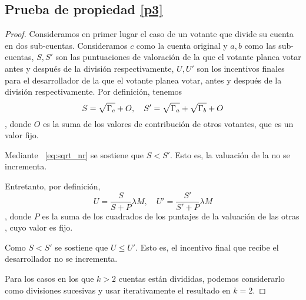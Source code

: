 \subsection{Prueba de propiedad \ref{p3}}
\begin{proof}
	Consideramos en primer lugar el caso de un votante que divide su cuenta en dos sub-cuentas. Consideramos $c$ como la cuenta original y $a,b$ como las sub-cuentas, $S,S'$ son las puntuaciones de valoración de la \dapp que el votante planea votar antes y después de la división respectivamente, $U,U'$ son los incentivos finales para el desarrollador de la \dapp que el votante planea votar, antes y después de la división respectivamente. Por definición, tenemos
	$$S= \sqrt{\Gamma_c}+O,\quad S'=\sqrt{\Gamma_a}+\sqrt{\Gamma_b}+O$$,
	donde $O$ es la suma de los valores de contribución de otros votantes, que es un valor fijo.

	Mediante ~\ref{eq:sqrt_nr} se sostiene que $S < S'$. Esto es, la valuación de la \dapp no se incrementa.

	Entretanto, por definición,
	$$U = \frac{S}{S+P}\lambda M,\quad U' = \frac{S'}{S'+P} \lambda M$$,
	donde $P$ es la suma de los cuadrados de los puntajes de la valuación de las otras \dapp, cuyo valor es fijo.

	Como $S < S'$ se sostiene que $U \leq U'$. Esto es, el incentivo final que recibe el desarrollador no se incrementa.

	Para los casos en los que $k>2$ cuentas están divididas, podemos considerarlo como divisiones sucesivas y usar iterativamente el resultado en $k=2$.

\end{proof}
